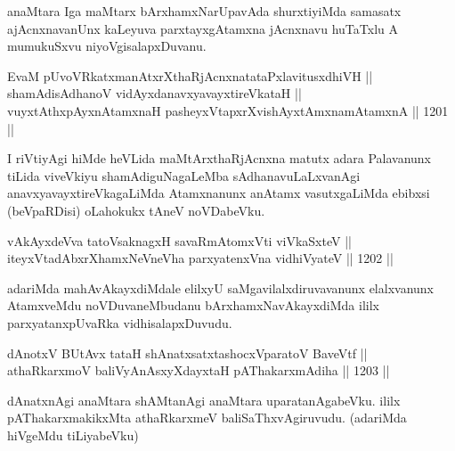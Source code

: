 \begin{artha}
anaMtara Iga maMtarx bArxhamxNarUpavAda shurxtiyiMda samasatx ajAcnxnavanUnx kaLeyuva parxtayxgAtamxna jAcnxnavu huTaTxlu A mumukuSxvu niyoVgisalapxDuvanu.
\end{artha}


\begin{shl}
EvaM pUvoVRkatxmanAtxrXthaRjAcnxnatataPxlavitusxdhiVH || \\
shamAdisAdhanoV vidAyxdanavxyavayxtireVkataH || \\
vuyxtAthxpAyxnAtamxnaH pasheyxVtapxrXvishAyx\s \s tAmxnamAtamxnA ||  1201 || 
\end{shl} 

\begin{artha}
I riVtiyAgi hiMde heVLida maMtArxthaRjAcnxna matutx adara Palavanunx tiLida viveVkiyu shamAdiguNagaLeMba sAdhanavuLaLxvanAgi anavxyavayxtireVkagaLiMda Atamxnanunx anAtamx vasutxgaLiMda ebibxsi (beVpaRDisi) oLahokukx tAneV noVDabeVku.
\end{artha}

\begin{shl}
vAkAyxdeVva tatoV\s saknagxH savaRmAtomxVti viVkaSxteV || \\
iteyxVtadAbxrXhamxNeVneVha parxyatenxVna vidhiVyateV ||  1202 ||  
\end{shl}

\begin{artha}
adariMda mahAvAkayxdiMdale elilxyU saMgavilalxdiruvavanunx elalxvanunx AtamxveMdu noVDuvaneMbudanu bArxhamxNavAkayxdiMda ililx parxyatanxpUvaRka vidhisalapxDuvudu.
\end{artha}

\begin{shl}
dAnotxV BUtAvx tataH shAnatxsatxtashocxVparatoV BaveVtf ||  \\
athaRkarxmoV baliVyAnAsxyXdayxtaH pAThakarxmAdiha ||  1203 ||  
\end{shl}


\begin{artha}
dAnatxnAgi anaMtara shAMtanAgi anaMtara uparatanAgabeVku. ililx pAThakarxmakikxMta athaRkarxmeV baliSaThxvAgiruvudu. (adariMda hiVgeMdu tiLiyabeVku)
\end{artha}


